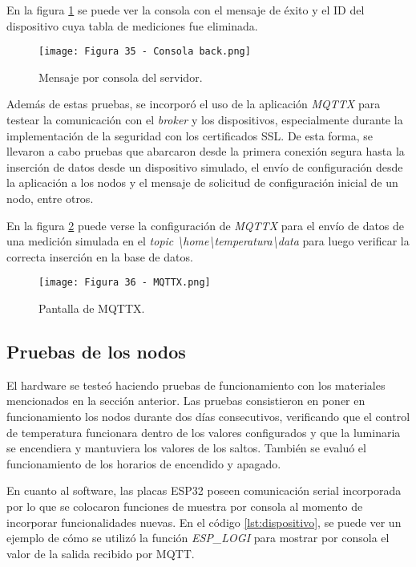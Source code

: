 En la figura \ref{fig:35} se puede ver la consola con el mensaje de éxito y el ID del dispositivo cuya tabla de mediciones fue eliminada.

\newpage
\begin{figure}[h]
\centering
\texttt{[image: Figura 35 - Consola back.png]}
\caption[Prueba backend]{Mensaje por consola del servidor.}
\label{fig:35}
\end{figure}

Además de estas pruebas, se incorporó el uso de la aplicación \textit{MQTTX} para testear la comunicación con el \textit{broker} y los dispositivos, especialmente durante la implementación de la seguridad con los certificados SSL. De esta forma, se llevaron a cabo pruebas que abarcaron desde la primera conexión segura hasta la inserción de datos desde un dispositivo simulado, el envío de configuración desde la aplicación a los nodos y el mensaje de solicitud de configuración inicial de un nodo, entre otros.

En la figura \ref{fig:36} puede verse la configuración de \textit{MQTTX} para el envío de datos de una medición simulada en el \textit{topic \textbackslash home\textbackslash temperatura\textbackslash data} para luego verificar la correcta inserción en la base de datos.

\begin{figure}[h]
\centering
\texttt{[image: Figura 36 - MQTTX.png]}
\caption[MQTTX]{Pantalla de MQTTX.}
\label{fig:36}
\end{figure}

\subsection{Pruebas de los nodos}

El hardware se testeó haciendo pruebas de funcionamiento con los materiales mencionados en la sección anterior. Las pruebas consistieron en poner en funcionamiento los nodos durante dos días consecutivos, verificando que el control de temperatura funcionara dentro de los valores configurados y que la luminaria se encendiera y mantuviera los valores de los saltos. También se evaluó el funcionamiento de los horarios de encendido y apagado.

En cuanto al software, las placas ESP32 poseen comunicación serial incorporada por lo que se colocaron funciones de muestra por consola al momento de incorporar funcionalidades nuevas. En el código \ref{lst:dispositivo}, se puede ver un ejemplo de cómo se utilizó la función \textit{ESP\_LOGI} para mostrar por consola el valor de la salida recibido por MQTT.

